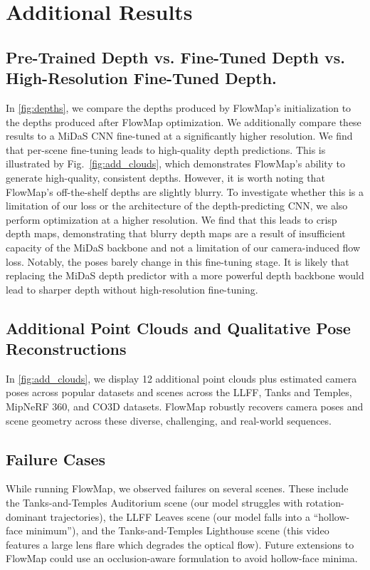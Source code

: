\section{Additional Results}




\subsection{Pre-Trained Depth vs. Fine-Tuned Depth vs. High-Resolution Fine-Tuned Depth.}
In \cref{fig:depths}, we compare the depths produced by FlowMap's initialization to the depths produced after FlowMap optimization.
We additionally compare these results to a MiDaS CNN fine-tuned at a significantly higher resolution.
We find that per-scene fine-tuning leads to high-quality depth predictions.
This is illustrated by Fig.~\ref{fig:add_clouds}, which demonstrates FlowMap's ability to generate high-quality, consistent depths.
However, it is worth noting that FlowMap's off-the-shelf depths are slightly blurry.
To investigate whether this is a limitation of our loss or the architecture of the depth-predicting CNN, we also perform optimization at a higher resolution.
We find that this leads to crisp depth maps, demonstrating that blurry depth maps are a result of insufficient capacity of the MiDaS backbone and not a limitation of our camera-induced flow loss.
Notably, the poses barely change in this fine-tuning stage.
It is likely that replacing the MiDaS depth predictor with a more powerful depth backbone would lead to sharper depth without high-resolution fine-tuning.




\subsection{Additional Point Clouds and Qualitative Pose Reconstructions}
In \cref{fig:add_clouds}, we display 12 additional point clouds plus estimated camera poses across popular datasets and scenes across the LLFF, Tanks and Temples, MipNeRF 360, and CO3D datasets.
FlowMap robustly recovers camera poses and scene geometry across these diverse, challenging, and real-world sequences.

\subsection{Failure Cases}
While running FlowMap, we observed failures on several scenes.
These include the Tanks-and-Temples Auditorium scene (our model struggles with rotation-dominant trajectories), the LLFF Leaves scene (our model falls into a ``hollow-face minimum''), and the Tanks-and-Temples Lighthouse scene (this video features a large lens flare which degrades the optical flow).
Future extensions to FlowMap could use an occlusion-aware formulation to avoid hollow-face minima.
